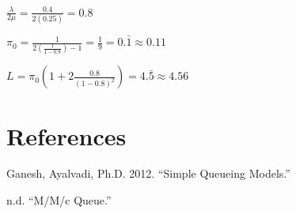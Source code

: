 \documentclass[]{article}
\begin{document}
\(\frac{\lambda}{2 \mu} = \frac{0.4}{2(0.25)} = 0.8\)

\(\pi_0 = \frac{1}{2(\frac{1}{1-0.8}) - 1} = \frac{1}{9} = 0. \bar{1} \approx 0.11\)

\(L = \pi_0 (1 + 2 \frac{0.8}{(1-0.8)^2}) = 4. \bar{5} \approx 4.56\)

\hypertarget{references}{%
\section*{References}\label{references}}

\hypertarget{refs}{}
\leavevmode\hypertarget{ref-qm1}{}%
Ganesh, Ayalvadi, Ph.D. 2012. ``Simple Queueing Models.''

\leavevmode\hypertarget{ref-wiki1}{}%
n.d. ``M/M/c Queue.''
\end{document}
